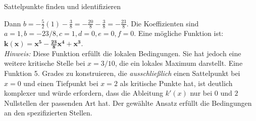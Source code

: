\begin{loesungsumgebung}{Sattelpunkte finden und identifizieren}
\begin{enumerate}[label=(\alph*)]
    Dann $b = -\frac{5}{2}(1) - \frac{3}{8} = -\frac{20}{8} - \frac{3}{8} = -\frac{23}{8}$.
    Die Koeffizienten sind $a=1, b=-23/8, c=1, d=0, e=0, f=0$.
    Eine mögliche Funktion ist: $\mathbf{k(x) = x^5 - \frac{23}{8}x^4 + x^3}$.\\
    \textit{Hinweis:} Diese Funktion erfüllt die lokalen Bedingungen. Sie hat jedoch eine weitere kritische Stelle bei $x=3/10$, die ein lokales Maximum darstellt. Eine Funktion 5. Grades zu konstruieren, die \textit{ausschließlich} einen Sattelpunkt bei $x=0$ und einen Tiefpunkt bei $x=2$ als kritische Punkte hat, ist deutlich komplexer und würde erfordern, dass die Ableitung $k'(x)$ nur bei $0$ und $2$ Nullstellen der passenden Art hat. Der gewählte Ansatz erfüllt die Bedingungen an den spezifizierten Stellen.


\end{enumerate}

\end{loesungsumgebung}


